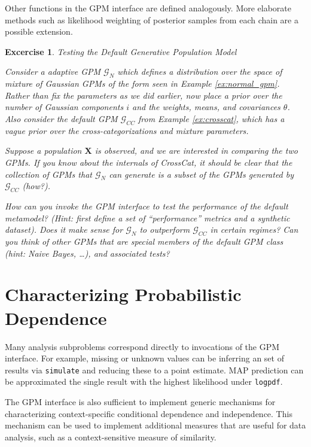 \documentclass[10pt,letterpaper]{article}
\newtheorem{excercise}{Excercise}[section]
\begin{document}
Other functions in the GPM interface are defined analogously. More elaborate
methods such as likelihood weighting of posterior samples from each chain are a
possible extension.

\begin{excercise} \label{ex:normal_vs_normal} Testing the Default Generative
Population Model

    Consider a adaptive GPM $\mathcal{G}_N$ which defines a distribution over
    the space of mixture of Gaussian GPMs of the form seen in Example
    \ref{ex:normal_gpm}. Rather than fix the parameters as we did earlier, now
    place a prior over the number of Gaussian components $i$ and the weights,
    means, and covariances $\theta$. Also consider the default GPM
    $\mathcal{G}_{CC}$ from Example \ref{ex:crosscat}, which has a vague prior
    over the cross-categorizations and mixture parameters.

    Suppose a population $\mathbf{X}$ is observed, and we are interested in
    comparing the two GPMs. If you know about the internals of CrossCat, it
    should be clear that the collection of GPMs that $\mathcal{G}_N$ can
    generate is a subset of the GPMs generated by $\mathcal{G}_{CC}$ (how?).

    How can you invoke the GPM interface to test the performance of the default
    metamodel? (Hint: first define a set of ``performance'' metrics and a
    synthetic dataset). Does it make sense for $\mathcal{G}_N$ to outperform
    $\mathcal{G}_{CC}$ in certain regimes? Can you think of other GPMs that are
    special members of the default GPM class (hint: Naive Bayes, \dots), and
    associated tests?
\end{excercise}

\section{Characterizing Probabilistic Dependence}

Many analysis subproblems correspond directly to invocations of the GPM
interface. For example, missing or unknown values can be inferring an set of
results via \texttt{simulate} and reducing these to a point estimate. MAP
prediction can be approximated the single result with the highest likelihood
under \texttt{logpdf}.

The GPM interface is also sufficient to implement generic mechanisms for
characterizing context-specific conditional dependence and independence. This
mechanism can be used to implement additional measures that are useful for data
analysis, such as a context-sensitive measure of similarity.
\end{document}
